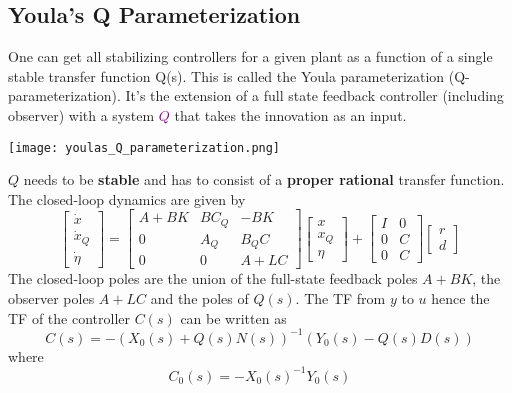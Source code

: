\subsection{Youla's Q Parameterization}
One can get all stabilizing controllers for a given plant as a function of a single stable transfer function Q(s). This is called the Youla parameterization (Q-parameterization). It's the extension of a full state feedback controller (including observer) with a system \textcolor{purple}{$Q$} that takes the innovation as an input.
\begin{center}
    \texttt{[image: youlas\_Q\_parameterization.png]}
\end{center}
$Q$ needs to be \textbf{stable} and has to consist of a \textbf{proper rational} transfer function.
\newpar{}
The closed-loop dynamics are given by
\begin{equation*}
    \begin{bmatrix}
        \dot{x}   \\
        \dot{x}_Q \\
        \dot{\eta}
    \end{bmatrix}
    =
    \begin{bmatrix}
        A+BK & BC_Q & -BK   \\
        0    & A_Q  & B_Q C \\
        0    & 0    & A+LC
    \end{bmatrix}
    \begin{bmatrix}
        x   \\
        x_Q \\
        \eta
    \end{bmatrix}
    +
    \begin{bmatrix}
        I & 0 \\
        0 & C \\
        0 & C
    \end{bmatrix}
    \begin{bmatrix}
        r \\
        d
    \end{bmatrix}
\end{equation*}
The closed-loop poles are the union of the full-state feedback poles $A+BK$, the observer poles $A+LC$ and the poles of $Q(s)$.
\newpar{}
The TF from $y$ to $u$ hence the TF of the controller $C(s)$ can be written as
\begin{equation*}
    C(s) = -{(X_0(s)+Q(s)N(s))}^{-1}(Y_0(s)-Q(s)D(s))
\end{equation*}
where
\begin{equation*}
    C_0(s)=-{X_0(s)}^{-1}Y_0(s)
\end{equation*}
